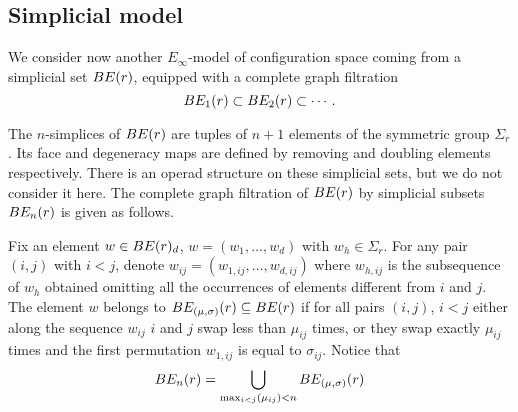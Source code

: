 \subsection{Simplicial model}\label{ss:simplicial model}

We consider now another $E_\infty$-model of  configuration space coming from a simplicial set $BE(r)$, equipped with a complete graph filtration
\[
BE_{1}(r) \subset BE_{2}(r) \subset \dotsb \,.
\]


The $n$-simplices of $BE(r)$ are tuples of $n+1$ elements of the symmetric group $\Sigma_r$.
Its face and degeneracy maps are defined by removing and doubling elements respectively.
There is an operad structure on these simplicial sets, but we do not consider it here.
The complete graph filtration of $BE(r)$ by simplicial subsets $BE_n(r)$ is given as follows.

\begin{definition}
	Fix an element $w \in BE(r)_{d}$, $w=(w_{1},\dots , w_{d})$ with $w_{h}\in \Sigma_r$.
 	For any pair $(i,j)$ with $i< j$, denote $w_{ij}=(w_{1,ij},\dots , w_{d,ij})$ where $w_{h,ij}$ is the subsequence of $w_{h}$ obtained omitting all the occurrences of elements different from $i$ and $j$.
	The element $w$ belongs to $BE_{(\mu,\sigma)}(r)\subseteq BE(r)$ if for all pairs $(i,j)$, $i< j$ either along the sequence $w_{ij}$ $i$ and $j$ swap less than $\mu_{ij}$ times,
	or they swap exactly $\mu_{ij}$ times and the first permutation $w_{1,ij}$ is equal to $\sigma_{ij}$.
	Notice that
	\begin{equation*}
		\label{def}
		BE_{n}(r)=\bigcup_{\max_{i<j} (\mu_{ij})< n} BE_{(\mu,\sigma)}(r)
	\end{equation*}
\end{definition}

